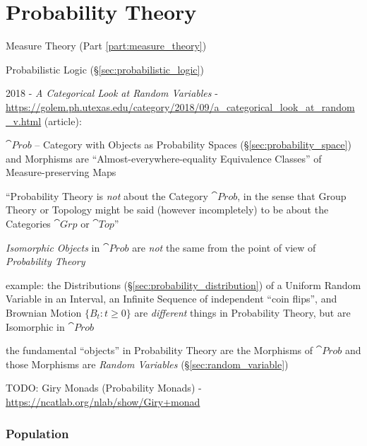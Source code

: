 \part{Probability Theory}\label{part:probability_theory}

\fist Measure Theory (Part \ref{part:measure_theory})

\fist Probabilistic Logic (\S\ref{sec:probabilistic_logic})

2018 - \emph{A Categorical Look at Random Variables} -
\url{https://golem.ph.utexas.edu/category/2018/09/a_categorical_look_at_random_v.html} (article):

$\cat{Prob}$ -- Category with Objects as Probability Spaces
(\S\ref{sec:probability_space}) and Morphisms are ``Almost-everywhere-equality
Equivalence Classes'' of Measure-preserving Maps

``Probability Theory is \emph{not} about the Category $\cat{Prob}$, in the sense
that Group Theory or Topology might be said (however incompletely) to be about
the Categories $\cat{Grp}$ or $\cat{Top}$''

\emph{Isomorphic Objects} in $\cat{Prob}$ are \emph{not} the same from the point
of view of \emph{Probability Theory}

example: the Distributions (\S\ref{sec:probability_distribution}) of a Uniform
Random Variable in an Interval, an Infinite Sequence of independent ``coin
flips'', and Brownian Motion $\{B_t : t \geq 0\}$ are \emph{different} things in
Probability Theory, but are Isomorphic in $\cat{Prob}$

the fundamental ``objects'' in Probability Theory are the Morphisms of
$\cat{Prob}$ and those Morphisms are \emph{Random Variables}
(\S\ref{sec:random_variable})

TODO: Giry Monads (Probability Monads) -
\url{https://ncatlab.org/nlab/show/Giry+monad}



\section{Population}\label{sec:population}


